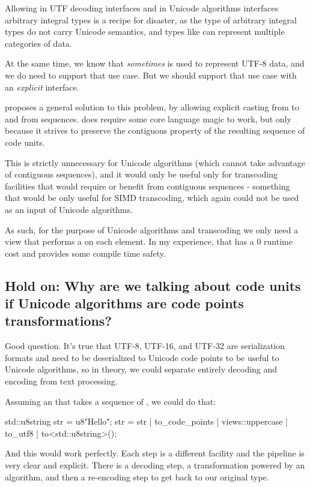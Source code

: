 \documentclass{wg21}
\begin{document}
Allowing in UTF decoding interfaces and in Unicode algorithms interfaces arbitrary integral types is a recipe for disaster, as the type of arbitrary integral types
do not carry Unicode semantics, and types like  can represent multiple categories of data.

At the same time, we know that \emph{sometimes}  is used to represent UTF-8 data, and we do need to support that use case. But we should support that use case with an \emph{explicit} interface.

 proposes a general solution to this problem, by allowing explicit casting from  to and from  sequences.
 does require some core language magic to work, but only because it strives to preserve the contiguous property of the resulting sequence of code units.

This is strictly unnecessary for Unicode algorithms (which cannot take advantage of contiguous sequences), and it would only be useful only for transcoding
facilities that would require or benefit from contiguous sequences - something that would be only useful for SIMD transcoding, which again could not be used as an input of Unicode algorithms.

As such, for the purpose of Unicode algorithms and transcoding we only need a view that performs a  on each element.
In my experience, that has a 0 runtime cost and provides some compile time safety.

\subsection{Hold on: Why are we talking about code units if Unicode algorithms are code points transformations?}

Good question.
It's true that UTF-8, UTF-16, and UTF-32 are serialization formats and need to be deserialized to Unicode code points to be useful
to Unicode algorithms, so in theory, we could separate entirely decoding and encoding from text processing.

Assuming an  that takes a sequence of , we could do that:

\begin{colorblock}
std::u8string str = u8"Hello";
str = str | to_code_points |  views::uppercase | to_utf8 | to<std::u8string>();
\end{colorblock}


And this would work perfectly.
Each step is a different facility and the pipeline is very clear and explicit.
There is a decoding step, a transformation powered by an algorithm, and then a re-encoding step to get back to our original type.
\end{document}
